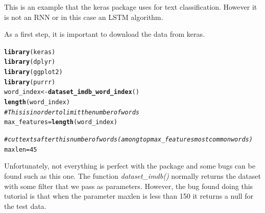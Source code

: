 \documentclass[letter,8pt]{article}\usepackage[]{graphicx}\usepackage[]{color}
\makeatletter
\newcommand{\hlnum}[1]{\textcolor[rgb]{0.686,0.059,0.569}{#1}}%
\newcommand{\hlcom}[1]{\textcolor[rgb]{0.678,0.584,0.686}{\textit{#1}}}%
\newcommand{\hlstd}[1]{\textcolor[rgb]{0.345,0.345,0.345}{#1}}%
\newcommand{\hlkwb}[1]{\textcolor[rgb]{0.69,0.353,0.396}{#1}}%
\newcommand{\hlkwd}[1]{\textcolor[rgb]{0.737,0.353,0.396}{\textbf{#1}}}%
\newenvironment{kframe}{%
 \def\at@end@of@kframe{}%
 \ifinner\ifhmode%
  \def\at@end@of@kframe{\end{minipage}}%
  \begin{minipage}{\columnwidth}%
 \fi\fi%
 \def\FrameCommand##1{\hskip\@totalleftmargin \hskip-\fboxsep
 \colorbox{shadecolor}{##1}\hskip-\fboxsep
     \hskip-\linewidth \hskip-\@totalleftmargin \hskip\columnwidth}%
 \MakeFramed {\advance\hsize-\width
   \@totalleftmargin\z@ \linewidth\hsize
   \@setminipage}}%
 {\par\unskip\endMakeFramed%
 \at@end@of@kframe}
\newenvironment{knitrout}{}{} %
\makeatother
\begin{document}
This is an example that the keras package uses for text classification. However it is not an RNN or in this case an LSTM algorithm.

As a first step, it is important to download the data from keras.
\begin{knitrout}
\color{fgcolor}\begin{kframe}
\begin{alltt}
\hlkwd{library}\hlstd{(keras)}
\hlkwd{library}\hlstd{(dplyr)}
\hlkwd{library}\hlstd{(ggplot2)}
\hlkwd{library}\hlstd{(purrr)}
\hlstd{word_index} \hlkwb{<-} \hlkwd{dataset_imdb_word_index}\hlstd{()}
\hlkwd{length}\hlstd{(word_index)}
\hlcom{# This is in order to limit the number of words }
\hlstd{max_features} \hlkwb{=} \hlkwd{length}\hlstd{(word_index)}

\hlcom{# cut texts after this number of words (among top max_features most common words)}
\hlstd{maxlen} \hlkwb{=} \hlnum{45}
\end{alltt}
\end{kframe}
\end{knitrout}
Unfortunately, not everything is perfect with the package and some bugs can be found such as this one. The function \textit{dataset\_imdb()} normally returns the dataset with some filter that we pass as parameters. However, the bug\cite{bugRNNkeras} found doing this tutorial is that when the parameter maxlen is less than 150 it returns a null for the test data.
\end{document}
